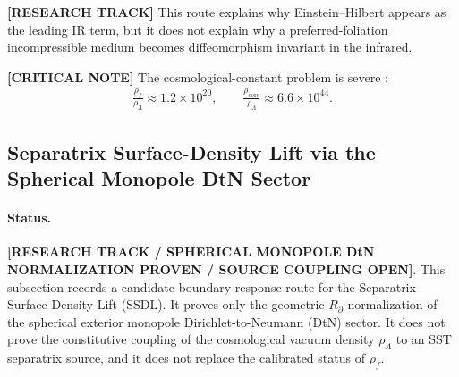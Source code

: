 \textbf{[RESEARCH TRACK]} This route explains why Einstein--Hilbert appears as
the leading IR term, but it does not explain why a preferred-foliation
incompressible medium becomes diffeomorphism invariant in the infrared.

\textbf{[CRITICAL NOTE]} The cosmological-constant problem is severe
\cite{Planck2018Cosmology}:
\begin{align}
    \frac{\rho_{\!f}}{\rho_\Lambda}
    \approx
    1.2\times10^{20},
    \qquad
    \frac{\rho_{\mathrm{core}}}{\rho_\Lambda}
    \approx
    6.6\times10^{44}.
\end{align}


\subsection{Separatrix Surface-Density Lift via the Spherical Monopole DtN Sector}
\label{subsec:ssdl_monopole_dtn}

\paragraph{Status.}
\textbf{[RESEARCH TRACK / SPHERICAL MONOPOLE DtN NORMALIZATION PROVEN / SOURCE COUPLING OPEN]}.
This subsection records a candidate boundary-response route for the
Separatrix Surface-Density Lift (SSDL).  It proves only the geometric
\(R_\partial\)-normalization of the spherical exterior monopole
Dirichlet-to-Neumann (DtN) sector.  It does not prove the constitutive
coupling of the cosmological vacuum density \(\rho_\Lambda\) to an SST
separatrix source, and it does not replace the calibrated status of
\(\rho_{\!f}\).

